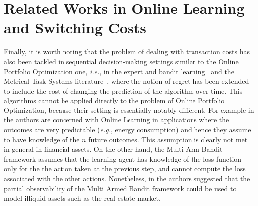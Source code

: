 \section{Related Works in Online Learning and Switching Costs}
Finally, it is worth noting that the problem of dealing with transaction costs has also been tackled in sequential decision-making settings similar to the Online Portfolio Optimization one, \emph{i.e.}, in the expert and bandit learning~\cite{li2018online,cesa2013online,trovo2016budgeted} and the Metrical Task Systems literature~\cite{lin2012online}, where the notion of regret has been extended to include the cost of changing the prediction of the algorithm over time. This algorithms cannot be applied directly to the problem of Online Portfolio Optimization, because their setting is essentially notably different. 
For example in \cite{li2018online} the authors are concerned with Online Learning in applications where the outcomes are very predictable (\emph{e.g.}, energy consumption) and hence they assume to have knowledge of the $n$ future outcomes. This assumption is clearly not met in general in financial assets.
On the other hand, the Multi Arm Bandit framework assumes that the learning agent has knowledge of the loss function only for the the action taken at the previous step, and cannot compute the loss associated with the other actions. Nonetheless, in \cite{ito2018regret} the authors suggested that the partial observability of the Multi Armed Bandit framework could be used to model illiquid assets such as the real estate market.

